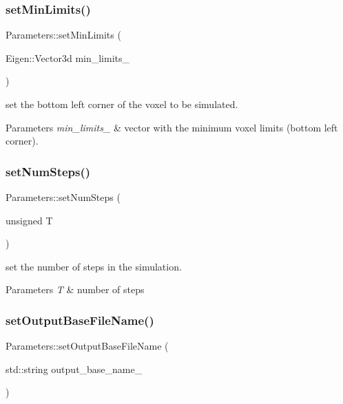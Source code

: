 \subsubsection{\texorpdfstring{set\+Min\+Limits()}{setMinLimits()}}
{\footnotesize\ttfamily Parameters\+::set\+Min\+Limits (\begin{DoxyParamCaption}\item[{Eigen\+::\+Vector3d}]{min\+\_\+limits\+\_\+ }\end{DoxyParamCaption})}



set the bottom left corner of the voxel to be simulated. 


\begin{DoxyParams}{Parameters}
{\em min\+\_\+limits\+\_\+} & vector with the minimum voxel limits (bottom left corner). \\
\hline
\end{DoxyParams}
\mbox{\label{class_parameters_af61156929c1abed67da0a1c9920ca508}} 
\subsubsection{\texorpdfstring{set\+Num\+Steps()}{setNumSteps()}}
{\footnotesize\ttfamily Parameters\+::set\+Num\+Steps (\begin{DoxyParamCaption}\item[{unsigned}]{T }\end{DoxyParamCaption})}



set the number of steps in the simulation. 


\begin{DoxyParams}{Parameters}
{\em T} & number of steps \\
\hline
\end{DoxyParams}
\mbox{\label{class_parameters_aec6b8dc2c119405ab2cdc4e6622ac616}} 
\subsubsection{\texorpdfstring{set\+Output\+Base\+File\+Name()}{setOutputBaseFileName()}}
{\footnotesize\ttfamily Parameters\+::set\+Output\+Base\+File\+Name (\begin{DoxyParamCaption}\item[{std\+::string}]{output\+\_\+base\+\_\+name\+\_\+ }\end{DoxyParamCaption})}



